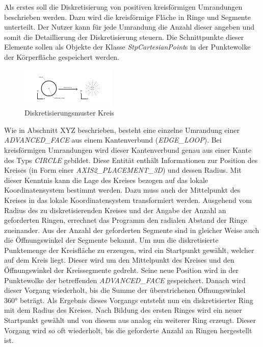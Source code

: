 Als erstes soll die Diskretisierung von positiven kreisförmigen Umrandungen beschrieben werden. Dazu wird die kreisförmige Fläche in Ringe und Segmente unterteilt. Der Nutzer kann für jede Umrandung die Anzahl dieser angeben und somit die Detaillierung der Diskretisierung steuern. Die Schnittpunkte dieser Elemente sollen als Objekte der Klasse \textit{StpCartesianPoint}s in der Punktewolke der Körperfläche gespeichert werden. 

\begin{figure}[h]
	\centering
	
	\includegraphics[width=0.7\linewidth]{img/discretcircle.pdf}
	
	\caption{Diskretisierungsmuster Kreis}
	\label{fig:discretecircle}
	
\end{figure}

Wie in Abschnitt XYZ beschrieben, besteht eine einzelne Umrandung einer \textit{ADVANCED\_FACE} aus einem Kantenverbund (\textit{EDGE\_LOOP}). Bei kreisförmigen Umrandungen wird dieser Kantenverbund genau aus einer Kante des Typs \textit{CIRCLE} gebildet. Diese Entität enthält Informationen zur Position des Kreises (in Form einer \textit{AXIS2\_PLACEMENT\_3D}) und dessen Radius.
Mit dieser Kenntnis kann die Lage des Kreises bezogen auf das lokale Koordinatensystem bestimmt werden. Dazu muss auch der Mittelpunkt des Kreises in das lokale Koordinatensystem transformiert werden. Ausgehend vom Radius des zu diskretisierenden Kreises und der Angabe der Anzahl an geforderten Ringen, errechnet das Programm den radialen Abstand der Ringe zueinander. Aus der Anzahl der geforderten Segmente sind in gleicher Weise auch die Öffnungswinkel der Segmente bekannt. Um nun die diskretisierte Punktemenge der Kreisfläche zu erzeugen, wird ein Startpunkt gewählt, welcher auf dem Kreis liegt. Dieser wird um den Mittelpunkt des Kreises und den Öffnungswinkel der Kreissegmente gedreht. Seine neue Position wird in der Punktewolke der betreffenden \textit{ADVANCED\_FACE} gespeichert. Danach wird dieser Vorgang wiederholt, bis die Summe der überstrichenen Öffnungswinkel 360° beträgt. Als Ergebnis dieses Vorgangs entsteht nun ein diskretisierter Ring mit dem Radius des Kreises. Nach Bildung des ersten Ringes wird ein neuer Startpunkt gewählt und von diesem aus analog ein weiterer Ring erzeugt. Dieser Vorgang wird so oft wiederholt, bis die geforderte Anzahl an Ringen hergestellt ist. 

